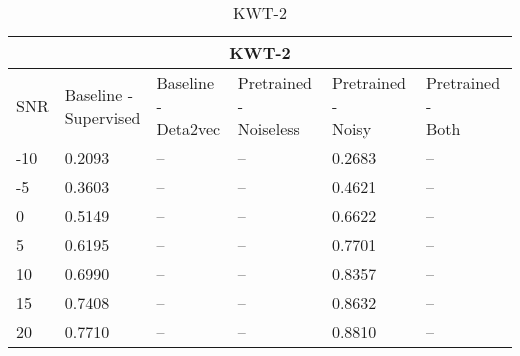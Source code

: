 \begin{table}[ht]
    \centering
    \begin{tabular}{@{}llllll@{}}
        \multicolumn{6}{c}{\textbf{KWT-2}}\\
        \toprule
        SNR    & \makecell{ Baseline - \\ Supervised } & \makecell{ Baseline - \\ Deta2vec } & \makecell{ Pretrained - \\ Noiseless } & \makecell{ Pretrained - \\ Noisy } & \makecell{ Pretrained - \\ Both } \\ \midrule
        -10  & 0.2093 & -- & -- & 0.2683 & -- \\
        -5   & 0.3603 & -- & -- & 0.4621 & -- \\
        0    & 0.5149 & -- & -- & 0.6622 & -- \\
        5    & 0.6195 & -- & -- & 0.7701 & -- \\
        10   & 0.6990 & -- & -- & 0.8357 & -- \\
        15   & 0.7408 & -- & -- & 0.8632 & -- \\
        20   & 0.7710 & -- & -- & 0.8810 & -- \\
        
        \bottomrule
    \end{tabular}
    \caption{KWT-2}
    \label{tab:KWT-2_snrmix_busxbblxcafxssn}
\end{table}

